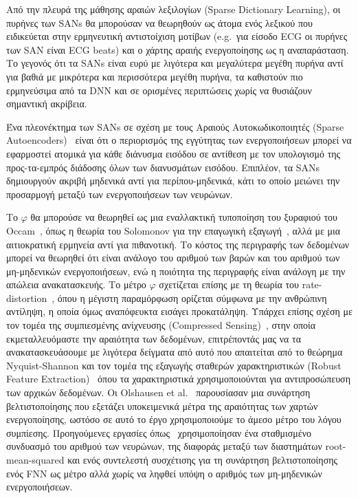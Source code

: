 Από την πλευρά της μάθησης αραιών λεξιλογίων (Sparse Dictionary Learning), οι πυρήνες των SANs θα μπορούσαν να θεωρηθούν ως άτομα ενός λεξικού που ειδικεύεται στην ερμηνευτική αντιστοίχιση μοτίβων (e.g.\ για είσοδο ECG οι πυρήνες των SAN είναι ECG beats) και ο χάρτης αραιής ενεργοποίησης ως η αναπαράσταση.
Το γεγονός ότι τα SANs είναι ευρύ με λιγότερα και μεγαλύτερα μεγέθη πυρήνα αντί για βαθιά με μικρότερα και περισσότερα μεγέθη πυρήνα, τα καθιστούν πιο ερμηνεύσιμα από τα DNN και σε ορισμένες περιπτώσεις χωρίς να θυσιάζουν σημαντική ακρίβεια.

Ένα πλεονέκτημα των SANs σε σχέση με τους Αραιούς Αυτοκωδικοποιητές (Sparse Autoencoders)~\cite{ng2011sparse} είναι ότι ο περιορισμός της εγγύτητας των ενεργοποιήσεων μπορεί να εφαρμοστεί ατομικά για κάθε διάνυσμα εισόδου σε αντίθεση με τον υπολογισμό της προς-τα-εμπρός διάδοσης όλων των διανυσμάτων εισόδου.
Επιπλέον, τα SANs δημιουργούν ακριβή μηδενικά αντί για περίπου-μηδενικά, κάτι το οποίο μειώνει την προσαρμογή μεταξύ των ενεργοποιήσεων των νευρώνων.

Το $\varphi$ θα μπορούσε να θεωρηθεί ως μια εναλλακτική τυποποίηση του ξυραφιού του Occam~\cite{soklakov2002occam}, όπως η θεωρία του Solomonov για την επαγωγική εξαγωγή~\cite{solomonoff1964formal}, αλλά με μια αιτιοκρατική ερμηνεία αντί για πιθανοτική.
Το κόστος της περιγραφής των δεδομένων μπορεί να θεωρηθεί ότι είναι ανάλογο του αριθμού των βαρών και του αριθμού των μη-μηδενικών ενεργοποιήσεων, ενώ η ποιότητα της περιγραφής είναι ανάλογη με την απώλεια ανακατασκευής.
Το μέτρο $\varphi$ σχετίζεται επίσης με τη θεωρία του rate-distortion~\cite{burger1971rate}, όπου η μέγιστη παραμόρφωση ορίζεται σύμφωνα με την ανθρώπινη αντίληψη, η οποία όμως αναπόφευκτα εισάγει προκατάληψη.
Υπάρχει επίσης σχέση με τον τομέα της συμπιεσμένης ανίχνευσης (Compressed Sensing)~\cite{donoho2006compressed}, στην οποία εκμεταλλευόμαστε την αραιότητα των δεδομένων, επιτρέποντάς μας να τα ανακατασκευάσουμε με λιγότερα δείγματα από αυτό που απαιτείται από το θεώρημα Nyquist-Shannon και τον τομέα της εξαγωγής σταθερών χαρακτηριστικών (Robust Feature Extraction)~\cite{kim2013deep} όπου τα χαρακτηριστικά χρησιμοποιούνται για αντιπροσώπευση των αρχικών δεδομένων.
Οι Olshausen et al.~\cite{olshausen1996emergence} παρουσίασαν μια συνάρτηση βελτιστοποίησης που εξετάζει υποκειμενικά μέτρα της αραιότητας των χαρτών ενεργοποίησης, ωστόσο σε αυτό το έργο χρησιμοποιούμε το άμεσο μέτρο του λόγου συμπίεσης.
Προηγούμενες εργασίες όπως~\cite{zhang2017ecg} χρησιμοποίησαν ένα σταθμισμένο συνδυασμό του αριθμού των νευρώνων, της διαφοράς μεταξύ των διαστημάτων root-mean-squared και ενός συντελεστή συσχέτισης για τη συνάρτηση βελτιστοποίησης ενός FNN ως μέτρο αλλά χωρίς να ληφθεί υπόψη ο αριθμός των μη-μηδενικών ενεργοποιήσεων.


